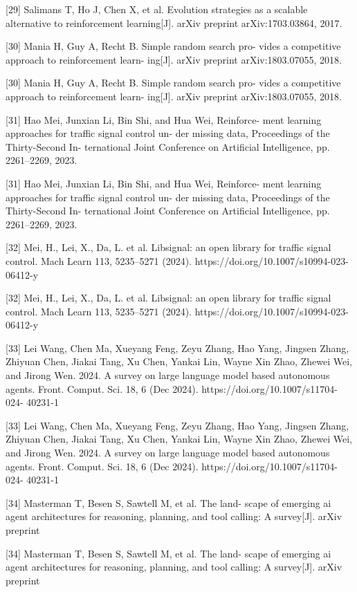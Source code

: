 \documentclass[12pt]{article}
\begin{document}
[29] Salimans T, Ho J, Chen X, et al. Evolution strategies
as a scalable alternative to reinforcement learning[J].
arXiv preprint arXiv:1703.03864, 2017.


[30] Mania H, Guy A, Recht B. Simple random search pro-
vides a competitive approach to reinforcement learn-
ing[J]. arXiv preprint arXiv:1803.07055, 2018.


[30] Mania H, Guy A, Recht B. Simple random search pro-
vides a competitive approach to reinforcement learn-
ing[J]. arXiv preprint arXiv:1803.07055, 2018.


[31] Hao Mei, Junxian Li, Bin Shi, and Hua Wei, Reinforce-
ment learning approaches for traffic signal control un-
der missing data, Proceedings of the Thirty-Second In-
ternational Joint Conference on Artificial Intelligence,
pp. 2261–2269, 2023.


[31] Hao Mei, Junxian Li, Bin Shi, and Hua Wei, Reinforce-
ment learning approaches for traffic signal control un-
der missing data, Proceedings of the Thirty-Second In-
ternational Joint Conference on Artificial Intelligence,
pp. 2261–2269, 2023.


[32] Mei, H., Lei, X., Da, L. et al. Libsignal: an open library
for traffic signal control. Mach Learn 113, 5235–5271
(2024). https://doi.org/10.1007/s10994-023-06412-y


[32] Mei, H., Lei, X., Da, L. et al. Libsignal: an open library
for traffic signal control. Mach Learn 113, 5235–5271
(2024). https://doi.org/10.1007/s10994-023-06412-y


[33] Lei Wang, Chen Ma, Xueyang Feng, Zeyu Zhang,
Hao Yang, Jingsen Zhang, Zhiyuan Chen, Jiakai Tang,
Xu Chen, Yankai Lin, Wayne Xin Zhao, Zhewei Wei,
and Jirong Wen. 2024. A survey on large language
model based autonomous agents. Front. Comput. Sci.
18, 6 (Dec 2024). https://doi.org/10.1007/s11704-024-
40231-1


[33] Lei Wang, Chen Ma, Xueyang Feng, Zeyu Zhang,
Hao Yang, Jingsen Zhang, Zhiyuan Chen, Jiakai Tang,
Xu Chen, Yankai Lin, Wayne Xin Zhao, Zhewei Wei,
and Jirong Wen. 2024. A survey on large language
model based autonomous agents. Front. Comput. Sci.
18, 6 (Dec 2024). https://doi.org/10.1007/s11704-024-
40231-1


[34] Masterman T, Besen S, Sawtell M, et al. The land-
scape of emerging ai agent architectures for reasoning,
planning, and tool calling: A survey[J]. arXiv preprint


[34] Masterman T, Besen S, Sawtell M, et al. The land-
scape of emerging ai agent architectures for reasoning,
planning, and tool calling: A survey[J]. arXiv preprint
\end{document}
